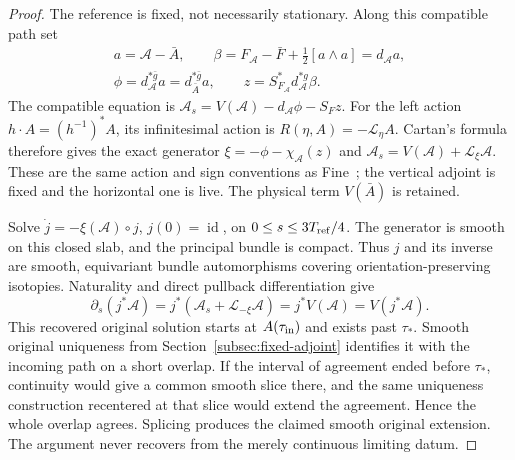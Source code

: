 \documentclass[11pt]{article}
\numberwithin{equation}{section}
\theoremstyle{definition}
\theoremstyle{remark}
\newcommand{\id}{\operatorname{id}}
\begin{document}
\begin{proof}
The reference is fixed, not necessarily stationary.
Along this compatible path set
\[
 \begin{gathered}
 a=\mathcal A-\bar A,\qquad
 \beta=F_{\mathcal A}-\bar F+\tfrac12[a\wedge a]
       =d_{\mathcal A}a,\\
 \phi=d_{\mathcal A}^{*\bar g}a
       =d_{\bar A}^{*\bar g}a,\qquad
 z=S_{F_{\mathcal A}}^*d_{\mathcal A}^{*g}\beta .
 \end{gathered}
\]
The compatible equation is
\(\mathcal A_s=V(\mathcal A)-d_{\mathcal A}\phi-S_Fz\).
For the left action \(h\cdot A=(h^{-1})^*A\), its
infinitesimal action is \(R(\eta,A)=-\mathcal L_\eta A\).
Cartan's formula therefore gives the exact generator
\(\xi=-\phi-\chi_{\mathcal A}(z)\) and
\(\mathcal A_s=V(\mathcal A)+\mathcal L_\xi\mathcal A\).
These are the same action and sign conventions as
Fine~\cite[Section 3 and Section 4.2 of version 2]{Fine2011};
the vertical adjoint is fixed and the horizontal one
is live. The physical term \(V(\bar A)\) is retained.

Solve \(\dot j=-\xi(\mathcal A)\circ j\), \(j(0)=\id\),
on \(0\le s\le3T_{\rm ref}/4\). The generator is smooth
on this closed slab, and the principal bundle is compact.
Thus \(j\) and its inverse are smooth, equivariant bundle
automorphisms covering orientation-preserving isotopies.
Naturality and direct pullback differentiation give
\[
 \partial_s(j^*\mathcal A)
 =j^*(\mathcal A_s+\mathcal L_{-\xi}\mathcal A)
 =j^*V(\mathcal A)=V(j^*\mathcal A).
\]
This recovered original solution starts at
\(A(\tau_{\rm in})\) and exists past \(\tau_*\).
Smooth original uniqueness from
Section~\ref{subsec:fixed-adjoint} identifies it with
the incoming path on a short overlap. If the interval
of agreement ended before \(\tau_*\), continuity
would give a common smooth slice there, and the same
uniqueness construction recentered at that slice
would extend the agreement. Hence the whole overlap
agrees. Splicing produces the claimed smooth original
extension. The argument never recovers from the
merely continuous limiting datum.


\end{proof}
\end{document}
